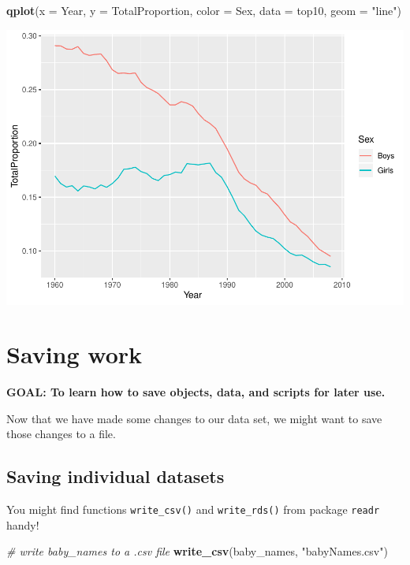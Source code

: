 \documentclass[]{book}
\newenvironment{Shaded}{\begin{snugshade}}{\end{snugshade}}
\newcommand{\CommentTok}[1]{\textcolor[rgb]{0.56,0.35,0.01}{\textit{#1}}}
\newcommand{\DataTypeTok}[1]{\textcolor[rgb]{0.13,0.29,0.53}{#1}}
\newcommand{\KeywordTok}[1]{\textcolor[rgb]{0.13,0.29,0.53}{\textbf{#1}}}
\newcommand{\NormalTok}[1]{#1}
\newcommand{\StringTok}[1]{\textcolor[rgb]{0.31,0.60,0.02}{#1}}
\begin{document}
\begin{enumerate}
\begin{Shaded}
\begin{Highlighting}[]
\KeywordTok{qplot}\NormalTok{(}\DataTypeTok{x =}\NormalTok{ Year, }
      \DataTypeTok{y =}\NormalTok{ TotalProportion, }
      \DataTypeTok{color =}\NormalTok{ Sex,}
      \DataTypeTok{data =}\NormalTok{ top10,}
      \DataTypeTok{geom =} \StringTok{"line"}\NormalTok{)}
\end{Highlighting}
\end{Shaded}

  \includegraphics{R/Rintro/figures/unnamed-chunk-72-1.pdf}
\end{enumerate}

\hypertarget{saving-work}{%
\section{Saving work}\label{saving-work}}

\textbf{GOAL: To learn how to save objects, data, and scripts for later use.}

Now that we have made some changes to our data set, we might want to
save those changes to a file.

\hypertarget{saving-individual-datasets}{%
\subsection{Saving individual datasets}\label{saving-individual-datasets}}

You might find functions \texttt{write\_csv()} and \texttt{write\_rds()} from package
\texttt{readr} handy!

\begin{Shaded}
\begin{Highlighting}[]
\CommentTok{# write baby_names to a .csv file}
\KeywordTok{write_csv}\NormalTok{(baby_names, }\StringTok{"babyNames.csv"}\NormalTok{)}
\end{Highlighting}
\end{Shaded}
\end{document}
